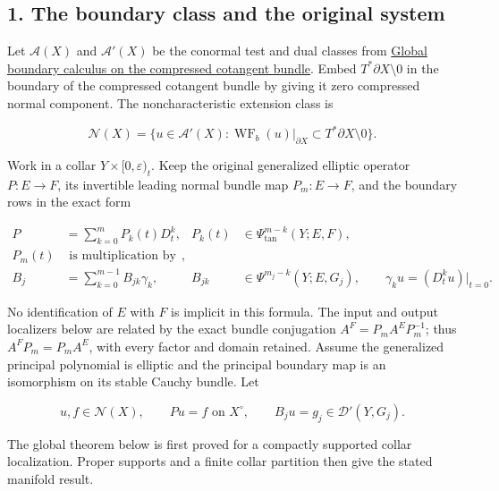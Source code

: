 \documentclass[
  11pt,
]{article}
\makeatletter
\let\ReaderOriginalAnchorStart\hyper@anchorstart
\let\ReaderOriginalAnchorEnd\hyper@anchorend
\let\ReaderPendingAliases\@empty
\def\ReaderArmAliases#1{\gdef\ReaderPendingAliases{#1}}
\def\hyper@anchorstart#1{\ReaderIfNativeAnchorTF{#1}{\ReaderPendingAliases\global\let\ReaderPendingAliases\@empty}{}\ReaderOriginalAnchorStart{#1}}
\makeatother
\begin{document}
\subsection{1. The boundary class and the original
system}\label{the-boundary-class-and-the-original-system}

Let \(\mathcal A(X)\) and \(\mathcal A'(X)\) be the conormal test and
dual classes from \href{global-boundary-calculus.pdf}{Global boundary
calculus on the compressed cotangent bundle}. Embed
\(T^*\partial X\setminus0\) in the boundary of the compressed cotangent
bundle by giving it zero compressed normal component. The
noncharacteristic extension class is

\[
 \mathcal N(X)=\{u\in\mathcal A'(X):
 \operatorname{WF}_b(u)|_{\partial X}
 \subset T^*\partial X\setminus0\}.
 \tag{BW1}
\]

Work in a collar \(Y\times[0,\varepsilon)_t\). Keep the original
generalized elliptic operator \(P:E\to F\), its invertible leading
normal bundle map \(P_m:E\to F\), and the boundary rows in the exact
form

\[
 \begin{aligned}
 P&=\sum_{k=0}^{m}P_k(t)D_t^k,
       &P_k(t)&\in\Psi_{\mathrm{tan}}^{m-k}(Y;E,F),\\
 P_m(t)&\text{ is multiplication by an invertible bundle map},\\
 B_j&=\sum_{k=0}^{m-1}B_{jk}\gamma_k,
       &B_{jk}&\in\Psi^{m_j-k}(Y;E,G_j),
 \qquad \gamma_k u=(D_t^ku)|_{t=0}.
 \end{aligned}
 \tag{BW2}
\]

No identification of \(E\) with \(F\) is implicit in this formula. The
input and output localizers below are related by the exact bundle
conjugation \(A^F=P_mA^EP_m^{-1}\); thus \(A^FP_m=P_mA^E\), with every
factor and domain retained. Assume the generalized principal polynomial
is elliptic and the principal boundary map is an isomorphism on its
stable Cauchy bundle. Let

\[
 u,f\in\mathcal N(X),\qquad Pu=f\text{ on }X^\circ,
 \qquad B_ju=g_j\in\mathcal D'(Y,G_j).
 \tag{BW3}
\]

The global theorem below is first proved for a compactly supported
collar localization. Proper supports and a finite collar partition then
give the stated manifold result.

\ReaderArmAliases{\ReaderOriginalAnchorStart{AN03-BWF-002}\ReaderOriginalAnchorEnd\begingroup\expandafter\def\csname @currentHref\endcsname{AN03-BWF-002}\label{AN03-BWF-002}\endgroup\ReaderOriginalAnchorStart{2-the-data-cannot-have-more-boundary-singularities-than-the-solution}\ReaderOriginalAnchorEnd\begingroup\expandafter\def\csname @currentHref\endcsname{2-the-data-cannot-have-more-boundary-singularities-than-the-solution}\label{2-the-data-cannot-have-more-boundary-singularities-than-the-solution}\endgroup}
\end{document}
